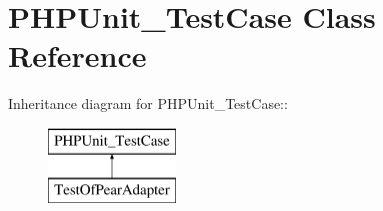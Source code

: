 \hypertarget{class_p_h_p_unit___test_case}{
\section{PHPUnit\_\-TestCase Class Reference}
\label{class_p_h_p_unit___test_case}
}
Inheritance diagram for PHPUnit\_\-TestCase::\begin{figure}[H]
\begin{center}
\leavevmode
\includegraphics[height=2cm]{class_p_h_p_unit___test_case}
\end{center}
\end{figure}

